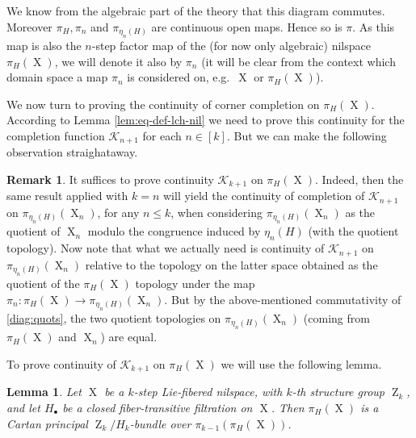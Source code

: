 \documentclass[a4paper,12pt,reqno]{amsart}
\newtheorem{lemma}[theorem]{Lemma}
\theoremstyle{definition}
\newtheorem{remark}[theorem]{Remark}
\def\to{\rightarrow}
\newcommand{\mc}{\mathcal}
\DeclareMathOperator{\ab}{Z}
\DeclareMathOperator{\ns}{X}
\begin{document}
\vspace{-0.3cm}

\noindent We know from the algebraic part of the theory that this diagram commutes. Moreover $\pi_H, \pi_n$ and $\pi_{\eta_{n}(H)}$ are continuous open maps. Hence so is $\pi$. As this map is also the $n$-step factor map of the (for now only algebraic) nilspace $\pi_H(\ns)$, we will denote it also by $\pi_{n}$ (it will be clear from the context which domain space a map $\pi_{n}$ is considered on, e.g.\ $\ns$ or $\pi_H(\ns)$).

We now turn to proving the continuity of corner completion on $\pi_H(\ns)$. According to Lemma \ref{lem:eq-def-lch-nil} we need to prove this continuity for the completion function $\mc{K}_{n+1}$ for each $n\in [k]$. But we can make the following observation straighataway.
\begin{remark}\label{rem:comdiag}
It suffices to prove continuity $\mc{K}_{k+1}$ on $\pi_H(\ns)$. Indeed, then the same result applied with $k=n$ will yield the continuity of completion of $\mc{K}_{n+1}$ on $\pi_{\eta_{n}(H)}(\ns_{n})$, for any $n\le k$, when considering $\pi_{\eta_{n}(H)}(\ns_{n})$ as the quotient of $\ns_n$ modulo the congruence  induced by $\eta_n(H)$ (with the quotient topology). Now note that what we actually need is continuity of $\mc{K}_{n+1}$ on $\pi_{\eta_n(H)}(\ns_n)$ relative to the topology on the latter space obtained as the quotient of the $\pi_H(\ns)$ topology under the map $\pi_n:\pi_H(\ns)\to \pi_{\eta_n(H)}(\ns_n)$. But by the above-mentioned commutativity of \eqref{diag:quots}, the two quotient topologies on $\pi_{\eta_{n}(H)}(\ns_{n})$ (coming from $\pi_H(\ns)$ and $\ns_n$) are equal.
\end{remark}

To prove continuity of $\mc{K}_{k+1}$ on $\pi_H(\ns)$ we will use the following lemma.

\begin{lemma}\label{lem:cont-diff-map-coset}
Let $\ns$ be a $k$-step Lie-fibered nilspace, with $k$-th structure group $\ab_k$, and let $H_\bullet$ be a closed fiber-transitive filtration on $\ns$. Then $\pi_H(\ns)$ is a Cartan principal $\ab_k/H_k$-bundle over $\pi_{k-1}(\pi_H(\ns))$.
\end{lemma}
\end{document}
